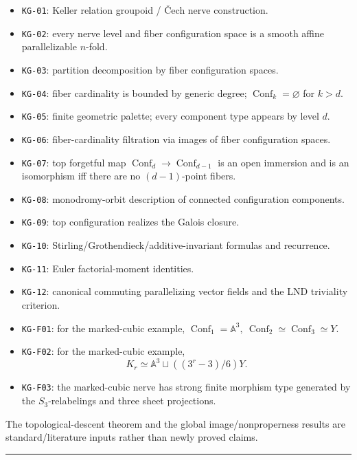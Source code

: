 \begin{itemize}
\tightlist
\item
  \texttt{KG-01}: Keller relation groupoid / Čech nerve construction.
\item
  \texttt{KG-02}: every nerve level and fiber configuration space is a
  smooth affine parallelizable \(n\)-fold.
\item
  \texttt{KG-03}: partition decomposition by fiber configuration spaces.
\item
  \texttt{KG-04}: fiber cardinality is bounded by generic degree;
  \(\operatorname{Conf}_k=\varnothing\) for \(k>d\).
\item
  \texttt{KG-05}: finite geometric palette; every component type appears
  by level \(d\).
\item
  \texttt{KG-06}: fiber-cardinality filtration via images of fiber
  configuration spaces.
\item
  \texttt{KG-07}: top forgetful map
  \(\operatorname{Conf}_d\to \operatorname{Conf}_{d-1}\) is an open
  immersion and is an isomorphism iff there are no \((d-1)\)-point
  fibers.
\item
  \texttt{KG-08}: monodromy-orbit description of connected configuration
  components.
\item
  \texttt{KG-09}: top configuration realizes the Galois closure.
\item
  \texttt{KG-10}: Stirling/Grothendieck/additive-invariant formulas and
  recurrence.
\item
  \texttt{KG-11}: Euler factorial-moment identities.
\item
  \texttt{KG-12}: canonical commuting parallelizing vector fields and
  the LND triviality criterion.
\item
  \texttt{KG-F01}: for the marked-cubic example,
  \(\operatorname{Conf}_1=\mathbb A^3,\ \operatorname{Conf}_2\simeq\operatorname{Conf}_3\simeq Y\).
\item
  \texttt{KG-F02}: for the marked-cubic example, \[
  K_r\simeq\mathbb A^3\sqcup((3^r-3)/6)Y.
  \]
\item
  \texttt{KG-F03}: the marked-cubic nerve has strong finite morphism
  type generated by the \(S_3\)-relabelings and three sheet projections.
\end{itemize}

The topological-descent theorem and the global image/nonproperness
results are standard/literature inputs rather than newly proved claims.

\begin{center}\rule{0.5\linewidth}{0.5pt}\end{center}

